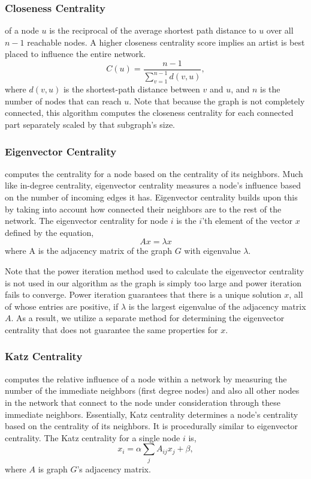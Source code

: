 \documentclass[pageno]{jpaper}
\begin{document}
\subsubsection{Closeness Centrality}
of a node $u$ is the reciprocal of the average shortest path distance to $u$ over all $n-1$ reachable nodes. A higher closeness centrality score implies an artist is best placed to influence the entire network.
\begin{equation}
C(u) = \frac{n - 1}{\sum_{v=1}^{n-1} d(v, u)},
\end{equation}
where $d(v, u)$ is the shortest-path distance between $v$ and $u$, and $n$ is the number of nodes that can reach $u$. Note that because the graph is not completely connected, this algorithm computes the closeness centrality for each connected part separately scaled by that subgraph's size.
\subsubsection{Eigenvector Centrality}
computes the centrality for a node based on the centrality of its neighbors. Much like in-degree centrality, eigenvector centrality measures a node's influence based on the number of incoming edges it has. Eigenvector centrality builds upon this by taking into account how connected their neighbors are to the rest of the network.
The eigenvector centrality for node $i$ is the $i$'th element of the vector $x$ defined by the equation,
\begin{equation}
Ax = \lambda x
\end{equation}
where A is the adjacency matrix of the graph $G$ with eigenvalue $\lambda$. 

Note that the power iteration method used to calculate the eigenvector centrality is not used in our algorithm as the graph is simply too large and power iteration fails to converge. Power iteration guarantees that there is a unique solution $x$, all of whose entries are positive, if $\lambda$ is the largest eigenvalue of the adjacency matrix $A$. As a result, we utilize a separate method for determining the eigenvector centrality that does not guarantee the same properties for $x$.
\subsubsection{Katz Centrality}
computes the relative influence of a node within a network by measuring the number of the immediate neighbors (first degree nodes) and also all other nodes in the network that connect to the node under consideration through these immediate neighbors. Essentially, Katz centrality determines a node's centrality based on the centrality of its neighbors. It is procedurally similar to eigenvector centrality. The Katz centrality for a single node $i$ is, 
\begin{equation}
x_i = \alpha \sum_{j} A_{ij} x_j + \beta,
\end{equation} where $A$ is graph $G$'s adjacency matrix. 
\end{document}
